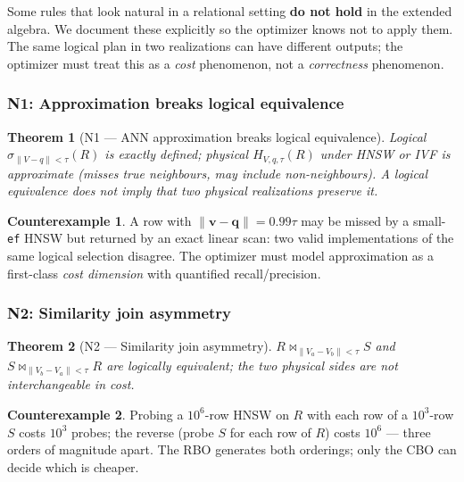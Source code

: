 \documentclass[acmsmall,review,anonymous]{acmart}
\theoremstyle{plain}
\newtheorem{theorem}{Theorem}
\theoremstyle{definition}
\newtheorem{counterexample}{Counterexample}
\newcommand{\vect}[1]{\boldsymbol{#1}}
\theoremstyle{remark}
\begin{document}
Some rules that look natural in a relational setting \textbf{do not
hold} in the extended algebra. We document these explicitly so the
optimizer knows not to apply them. The same logical plan in two
realizations can have different outputs; the optimizer must treat
this as a \emph{cost} phenomenon, not a \emph{correctness} phenomenon.

\subsubsection{N1: Approximation breaks logical equivalence}

\begin{theorem}[N1 --- ANN approximation breaks logical equivalence]\label{thm:n1}
Logical $\sigma_{\lVert V-q\rVert<\tau}(R)$ is exactly defined;
physical $H_{V, q, \tau}(R)$ under HNSW or IVF is approximate
(misses true neighbours, may include non-neighbours). A logical
equivalence does not imply that two physical realizations
preserve it.
\end{theorem}

\begin{counterexample}\label{ce:n1}
A row with $\lVert\vect{v}-\vect{q}\rVert = 0.99\tau$ may be
missed by a small-\texttt{ef} HNSW but returned by an exact linear
scan: two valid implementations of the same logical selection
disagree. The optimizer must model approximation as a first-class
\emph{cost dimension} with quantified recall/precision.
\end{counterexample}

\subsubsection{N2: Similarity join asymmetry}

\begin{theorem}[N2 --- Similarity join asymmetry]\label{thm:n2}
$R \bowtie_{\lVert V_a-V_b\rVert<\tau} S$ and
$S \bowtie_{\lVert V_b-V_a\rVert<\tau} R$ are logically
equivalent; the two physical sides are not interchangeable in cost.
\end{theorem}

\begin{counterexample}\label{ce:n2}
Probing a $10^6$-row HNSW on $R$ with each row of a $10^3$-row $S$
costs $10^3$ probes; the reverse (probe $S$ for each row of $R$)
costs $10^6$ --- three orders of magnitude apart. The RBO
generates both orderings; only the CBO can decide which is
cheaper.
\end{counterexample}
\end{document}
